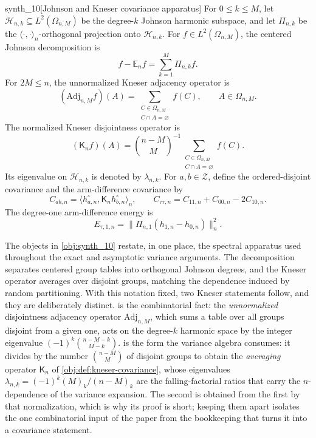 \documentclass[11pt]{article}
\begin{document}
\begin{definitionv}{synth_10}[Johnson and Kneser covariance apparatus]
For \(0\le k\le M\), let \(\mathcal H_{n,k}\subseteq L^2(\Omega_{n,M})\) be the degree-\(k\) Johnson harmonic subspace, and let \(\Pi_{n,k}\) be the \(\langle\cdot,\cdot\rangle_n\)-orthogonal projection onto \(\mathcal H_{n,k}\). For \(f\in L^2(\Omega_{n,M})\), the centered Johnson decomposition is
\[
f-\mathbb E_n f=\sum_{k=1}^M\Pi_{n,k}f.
\]
For \(2M\le n\), the unnormalized Kneser adjacency operator is
\[
(\mathrm{Adj}_{n,M}f)(A)=\sum_{\substack{C\in\Omega_{n,M}\\ C\cap A=\varnothing}} f(C),
\qquad A\in\Omega_{n,M}.
\]
The normalized Kneser disjointness operator is
\[
(\mathsf K_n f)(A)=\binom{n-M}{M}^{-1}
\sum_{\substack{C\in\Omega_{n,M}\\ C\cap A=\varnothing}} f(C).
\]
Its eigenvalue on \(\mathcal H_{n,k}\) is denoted by \(\lambda_{n,k}\). For \(a,b\in\mathcal Z\), define the ordered-disjoint covariance and the arm-difference covariance by
\[
C_{ab,n}=\langle h_{a,n}^{\circ},\mathsf K_n h_{b,n}^{\circ}\rangle_n,\qquad
C_{\tau\tau,n}=C_{11,n}+C_{00,n}-2C_{10,n}.
\]
The degree-one arm-difference energy is
\[
E_{\tau,1,n}=\|\Pi_{n,1}(h_{1,n}-h_{0,n})\|_n^2.
\]
\end{definitionv}

The objects in \cref{obj:synth_10} restate, in one place, the spectral apparatus used throughout the exact and asymptotic variance arguments. The decomposition separates centered group tables into orthogonal Johnson degrees, and the Kneser operator averages over disjoint groups, matching the dependence induced by random partitioning. With this notation fixed, two Kneser statements follow, and they are deliberately distinct.  is the combinatorial fact: the \emph{unnormalized} disjointness adjacency operator \(\mathrm{Adj}_{n,M}\), which sums a table over all groups disjoint from a given one, acts on the degree-\(k\) harmonic space by the integer eigenvalue \((-1)^k\binom{n-M-k}{M-k}\).  is the form the variance algebra consumes: it divides by the number \(\binom{n-M}{M}\) of disjoint groups to obtain the \emph{averaging} operator \(\mathsf K_n\) of \cref{obj:def:kneser-covariance}, whose eigenvalues \(\lambda_{n,k}=(-1)^k(M)_k/(n-M)_k\) are the falling-factorial ratios that carry the \(n\)-dependence of the variance expansion. The second is obtained from the first by that normalization, which is why its proof is short; keeping them apart isolates the one combinatorial input of the paper from the bookkeeping that turns it into a covariance statement.
\end{document}
